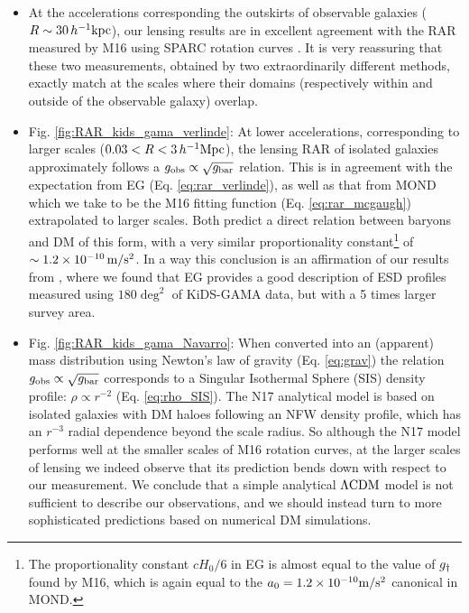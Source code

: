 \documentclass[usenatbib]{mnras}
\newcommand{\hkpc}{\, h^{-1}{\rm{kpc}} }
\newcommand{\hMpc}{\, h^{-1}{\rm{Mpc}} }
\newcommand{\mpss}{ {\rm m/s^2} }
\newcommand{\lcdm}{{\rm \Lambda CDM}}
\newcommand*{\E}[1]{\times 10^{#1}}
\newcommand{\un}[1]{_{\rm #1}}
\begin{document}
\begin{itemize}
	\item At the accelerations corresponding the outskirts of observable galaxies ($R \sim 30\hkpc$), our lensing results are in excellent agreement with the RAR measured by M16 using SPARC rotation curves \cite[]{lelli2016b}. It is very reassuring that these two measurements, obtained by two extraordinarily different methods, exactly match at the scales where their domains (respectively within and outside of the observable galaxy) overlap.
	
	\item Fig. \ref{fig:RAR_kids_gama_verlinde}: At lower accelerations, corresponding to larger scales ($0.03 < R < 3 \hMpc$), the lensing RAR of isolated galaxies approximately follows a $g\un{obs} \propto \sqrt{g\un{bar}}$ relation. This is in agreement with the expectation from EG (Eq. \ref{eq:rar_verlinde}), as well as that from MOND which we take to be the M16 fitting function (Eq. \ref{eq:rar_mcgaugh}) extrapolated to larger scales. Both predict a direct relation between baryons and DM of this form, with a very similar proportionality constant\footnote{The proportionality constant $c H_0 / 6$ in EG is almost equal to the value of $g\un{\dagger}$ found by M16, which is again equal to the $a_0=1.2\E{-10} \mpss$ canonical in MOND.} of $\sim1.2\E{-10} \, \mpss$. In a way this conclusion is an affirmation of our results from \cite{brouwer2017}, where we found that EG provides a good description of ESD profiles measured using $180 \deg^2$ of KiDS-GAMA data, but with a 5 times larger survey area.
	
	\item Fig. \ref{fig:RAR_kids_gama_Navarro}: When converted into an (apparent) mass distribution using Newton's law of gravity (Eq. \ref{eq:grav}) the relation $g\un{obs} \propto \sqrt{g\un{bar}}$ corresponds to a Singular Isothermal Sphere (SIS) density profile: $\rho \propto r^{-2}$ (Eq. \ref{eq:rho_SIS}). The N17 analytical model is based on isolated galaxies with DM haloes following an NFW density profile, which has an $r^{-3}$ radial dependence beyond the scale radius. So although the N17 model performs well at the smaller scales of M16 rotation curves, at the larger scales of lensing we indeed observe that its prediction bends down with respect to our measurement. We conclude that a simple analytical $\lcdm$ model is not sufficient to describe our observations, and we should instead turn to more sophisticated predictions based on numerical DM simulations.
	

\end{itemize}
\end{document}
